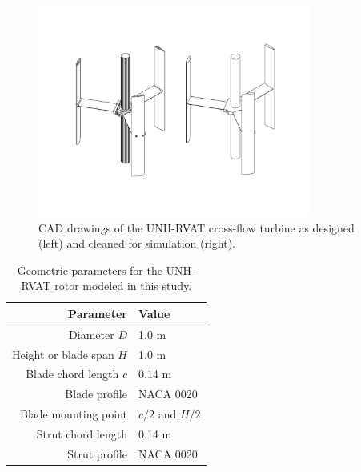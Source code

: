 \documentclass[aip,graphicx]{revtex4-1}
\begin{document}
\begin{figure}
    \centering

    \includegraphics[clip, trim=0 1in 0 1in, width=0.8\textwidth]{CAD}

    \caption{CAD drawings of the UNH-RVAT cross-flow turbine as designed (left)
        and cleaned for simulation (right).}

    \label{fig:cfd-cad}
\end{figure}

\begin{table}
    \centering
    \begin{tabular}{r|l}
        Parameter & Value \\
        \hline
        Diameter $D$ & 1.0 m \\
        Height or blade span $H$ & 1.0 m \\
        Blade chord length $c$ & 0.14 m \\
        Blade profile & NACA 0020 \\
        Blade mounting point & $c/2$ and $H/2$ \\
        Strut chord length & 0.14 m \\
        Strut profile & NACA 0020
    \end{tabular}

    \caption{Geometric parameters for the UNH-RVAT rotor modeled in this study.}

    \label{tab:turb-geom}
\end{table}
\end{document}
